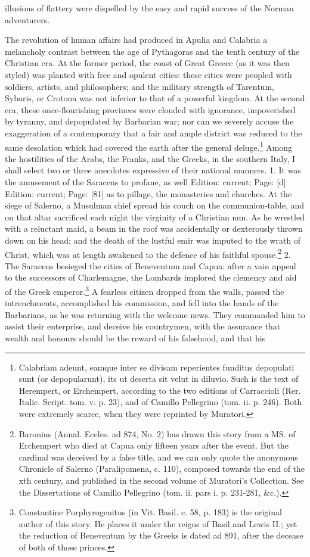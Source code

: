 illusions of flattery were dispelled by the easy and rapid success of the Norman adventurers.

The revolution of human affairs had produced in Apulia and Calabria a melancholy contrast between the age of Pythagoras and the tenth century of the Christian era. At the former period, the coast of Great Greece (as it was then styled) was planted with free and opulent cities: these cities were peopled with soldiers, artists, and philosophers; and the military strength of Tarentum, Sybaris, or Crotona was not inferior to that of a powerful kingdom. At the second era, these once-flourishing provinces were clouded with ignorance, impoverished by tyranny, and depopulated by Barbarian war; nor can we severely accuse the exaggeration of a contemporary that a fair and ample district was reduced to the same desolation which had covered the earth after the general deluge.\footnote{Calabriam adeunt, eamque inter se divisam reperientes funditus depopulati sunt (or depopularunt), its ut deserta sit velut in diluvio. Such is the text of Herempert, or Erchempert, according to the two editions of Carraccioli (Rer. Italic. Script. tom. v. p. 23), and of Camillo Pellegrino (tom. ii. p. 246). Both were extremely scarce, when they were reprinted by Muratori.} Among the hostilities of the Arabs, the Franks, and the Greeks, in the southern Italy, I shall select two or three anecdotes expressive of their national manners. 1. It was the amusement of the Saracens to profane, as well Edition: current; Page: [d] Edition: current; Page: [81] as to pillage, the monasteries and churches. At the siege of Salerno, a Musulman chief spread his couch on the communion-table, and on that altar sacrificed each night the virginity of a Christian nun. As he wrestled with a reluctant maid, a beam in the roof was accidentally or dexterously thrown down on his head; and the death of the lustful emir was imputed to the wrath of Christ, which was at length awakened to the defence of his faithful spouse.\footnote{Baronius (Annal. Eccles. ad 874, No. 2) has drawn this story from a MS. of Erchempert who died at Capua only fifteen years after the event. But the cardinal was deceived by a false title, and we can only quote the anonymous Chronicle of Salerno (Paralipomena, c. 110), composed towards the end of the xth century, and published in the second volume of Muratori\texthebrew{}’s Collection. See the Dissertations of Camillo Pellegrino (tom. ii. pars i. p. 231-281, \&c.).} 2. The Saracens besieged the cities of Beneventum and Capua: after a vain appeal to the successors of Charlemagne, the Lombards implored the clemency and aid of the Greek emperor.\footnote{Constantine Porphyrogenitus (in Vit. Basil. c. 58, p. 183) is the original author of this story. He places it under the reigns of Basil and Lewis II.; yet the reduction of Beneventum by the Greeks is dated ad 891, after the decease of both of those princes.} A fearless citizen dropped from the walls, passed the intrenchments, accomplished his commission, and fell into the hands of the Barbarians, as he was returning with the welcome news. They commanded him to assist their enterprise, and deceive his countrymen, with the assurance that wealth and honours should be the reward of his falsehood, and that his 